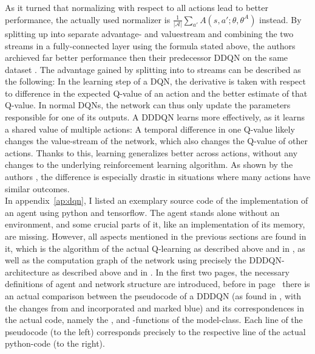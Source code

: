 As it turned that normalizing with respect to all actions lead to better performance, the actually used normalizer is $\frac{1}{|\mathcal{A}|} \sum_{a'} A(s, a'; \theta, \theta^A)$ instead. By splitting up into separate advantage- and valuestream and combining the two streams in a fully-connected layer using the formula stated above, the authors archieved far better performance then their predecessor DDQN on the same dataset \cite{wang_dueling_2015}. The advantage gained by splitting into to streams can be described as the following: In the learning step of a DQN, the derivative is taken with respect to difference in the expected Q-value of an action and the better estimate of that Q-value. In normal DQNs, the network can thus only update the parameters responsible for one of its outputs. A DDDQN learns more effectively, as it learns a shared value of multiple actions: A temporal difference in one Q-value likely changes the value-stream of the network, which also changes the Q-value of other actions. Thanks to this, learning generalizes better across actions, without any changes to the underlying reinforcement learning algorithm. As shown by the authors \cite{wang_dueling_2015}, the difference is especially drastic in situations where many actions have similar outcomes.\\


In appendix~\ref{ap:dqn}, I listed an exemplary source code of the implementation of an agent using python and tensorflow. The agent stands alone without an environment, and some crucial parts of it, like an implementation of its memory, are missing. However, all aspects mentioned in the previous sections are found in it, which is the algorithm of the actual Q-learning as described above and in \cite{van_hasselt_deep_2015}, as well as the computation graph of the network using precisely the DDDQN-architecture as described above and in \cite{wang_dueling_2015}. In the first two pages, the necessary definitions of agent and network structure are introduced, before in page~\pageref{ap:dqn_comparison} there is an actual comparison between the pseudocode of a DDDQN (as found in \cite{mnih_human-level_2015}, with the changes from \cite{van_hasselt_deep_2015} and \cite{lillicrap_continuous_2015} incorporated and marked blue) and its correspondences in the actual code, namely the ,  and -functions of the model-class. Each line of the pseudocode (to the left) corresponds precisely to the respective line of the actual python-code (to the right).


